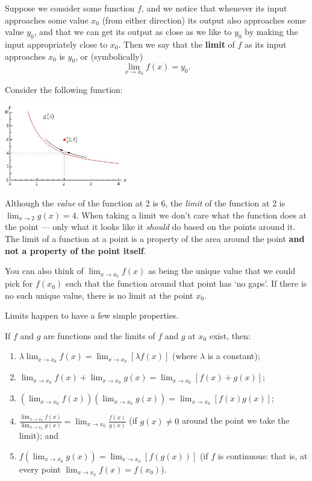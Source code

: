 Suppose we consider some function $ f $, and we notice that whenever its input approaches some value $ x_0 $ (from either direction) its
output also approaches some value $ y_0 $, and that we can get its output as close as we like to $ y_0 $ by making the input appropriately
close to $ x_0 $. Then we say that the \textbf{limit} of $ f $ as its input approaches $ x_0 $ is $ y_0 $, or (symbolically)
\begin{displaymath}
  \lim_{x \to x_0} f(x) = y_0.
\end{displaymath}

Consider the following function:
\begin{center}
  \includegraphics[width=0.4\textwidth]{oslimit2}
\end{center}
Although the \textit{value} of the function at 2 is 6, the \textit{limit} of the function at 2 is $ \lim_{x \to 2} g(x) = 4 $. When taking a limit we
don't care what the function does at the point --- only what it looks like it \emph{should} do based on the points around it. The limit of a function
at a point is a property of the area around the point \textbf{and not a property of the point itself}.

You can also think of $ \lim_{x \to x_0} f(x) $ as being the unique value that we could pick for $ f(x_0) $ such that the function
around that point has `no gaps'. If there is no such unique value, there is no limit at the point $ x_0 $.

Limits happen to have a few simple properties.
\begin{thm}
  If $ f $ and $ g $ are functions and the limits of $ f $ and $ g $ at $ x_0 $ exist, then:
  \begin{enumerate}
    \item $ \displaystyle \lambda \lim_{x \to x_0} f(x) = \lim_{x \to x_0} [\lambda f(x)] $ (where $ \lambda $ is a constant);
    \item $ \displaystyle \lim_{x \to x_0} f(x) + \lim_{x \to x_0} g(x) = \lim_{x \to x_0} [f(x) + g(x)] $;
    \item $ \displaystyle \left(\lim_{x \to x_0} f(x)\right)\left(\lim_{x \to x_0} g(x)\right) = \lim_{x \to x_0} [f(x)g(x)] $;
    \item $ \displaystyle \frac{\lim_{x \to x_0} f(x)}{\lim_{x \to x_0} g(x)} = \lim_{x \to x_0} \frac{f(x)}{g(x)} $ (if $ g(x) \neq 0 $ around
          the point we take the limit); and
    \item $ \displaystyle f(\lim_{x \to x_0} g(x)) = \lim_{x \to x_0} [f(g(x))] $ (if $ f $ is continuous: that is, at every
          point $ \lim_{x \to x_0} f(x) = f(x_0) $).
  \end{enumerate}
\end{thm}

